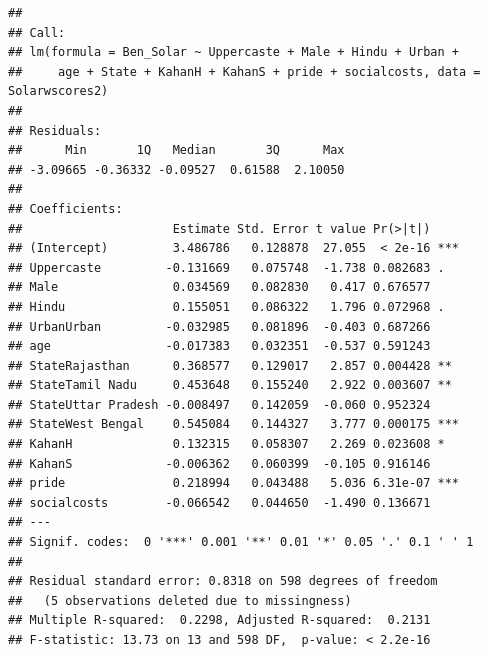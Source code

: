 \documentclass[
]{article}
\begin{document}
\begin{verbatim}
## 
## Call:
## lm(formula = Ben_Solar ~ Uppercaste + Male + Hindu + Urban + 
##     age + State + KahanH + KahanS + pride + socialcosts, data = Solarwscores2)
## 
## Residuals:
##      Min       1Q   Median       3Q      Max 
## -3.09665 -0.36332 -0.09527  0.61588  2.10050 
## 
## Coefficients:
##                     Estimate Std. Error t value Pr(>|t|)    
## (Intercept)         3.486786   0.128878  27.055  < 2e-16 ***
## Uppercaste         -0.131669   0.075748  -1.738 0.082683 .  
## Male                0.034569   0.082830   0.417 0.676577    
## Hindu               0.155051   0.086322   1.796 0.072968 .  
## UrbanUrban         -0.032985   0.081896  -0.403 0.687266    
## age                -0.017383   0.032351  -0.537 0.591243    
## StateRajasthan      0.368577   0.129017   2.857 0.004428 ** 
## StateTamil Nadu     0.453648   0.155240   2.922 0.003607 ** 
## StateUttar Pradesh -0.008497   0.142059  -0.060 0.952324    
## StateWest Bengal    0.545084   0.144327   3.777 0.000175 ***
## KahanH              0.132315   0.058307   2.269 0.023608 *  
## KahanS             -0.006362   0.060399  -0.105 0.916146    
## pride               0.218994   0.043488   5.036 6.31e-07 ***
## socialcosts        -0.066542   0.044650  -1.490 0.136671    
## ---
## Signif. codes:  0 '***' 0.001 '**' 0.01 '*' 0.05 '.' 0.1 ' ' 1
## 
## Residual standard error: 0.8318 on 598 degrees of freedom
##   (5 observations deleted due to missingness)
## Multiple R-squared:  0.2298, Adjusted R-squared:  0.2131 
## F-statistic: 13.73 on 13 and 598 DF,  p-value: < 2.2e-16
\end{verbatim}
\end{document}
